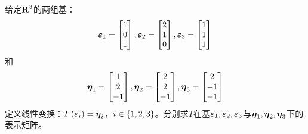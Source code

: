 \setcounter{problem}{32}
\begin{problem}
给定\(\boldsymbol{\mathrm{R}}^3\)的两组基：
\begin{equation*}
    \boldsymbol{\varepsilon}_1=\begin{bmatrix}1\\0\\1\end{bmatrix},
    \boldsymbol{\varepsilon}_2=\begin{bmatrix}2\\1\\0\end{bmatrix},
    \boldsymbol{\varepsilon}_3=\begin{bmatrix}1\\1\\1\end{bmatrix}
\end{equation*}
和
\begin{equation*}
    \boldsymbol{\eta}_1=\begin{bmatrix}1\\2\\-1\end{bmatrix},
    \boldsymbol{\eta}_2=\begin{bmatrix}2\\2\\-1\end{bmatrix},
    \boldsymbol{\eta}_3=\begin{bmatrix}2\\-1\\-1\end{bmatrix}
\end{equation*}
定义线性变换：\(T\left( \boldsymbol{\varepsilon}_i \right)=\boldsymbol{\eta}_i\)，\(i\in\left\{1,2,3 \right\}\)。分别求\(T\)在基\(\boldsymbol{\varepsilon}_1,\boldsymbol{\varepsilon}_2,\boldsymbol{\varepsilon}_3\)与\(\boldsymbol{\eta}_1,\boldsymbol{\eta}_2,\boldsymbol{\eta}_3\)下的表示矩阵。
\end{problem}
